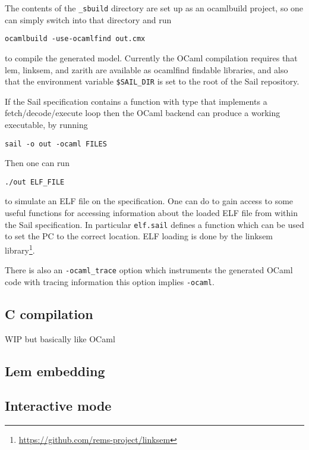 The contents of the \verb+_sbuild+ directory are set up as an
ocamlbuild project, so one can simply switch into that directory and run
\begin{verbatim}
ocamlbuild -use-ocamlfind out.cmx
\end{verbatim}
to compile the generated model. Currently the OCaml compilation
requires that lem, linksem, and zarith are available as ocamlfind
findable libraries, and also that the environment variable
\verb+$SAIL_DIR+ is set to the root of the Sail repository.

If the Sail specification contains a  function with type
 that implements a fetch/decode/execute loop then the
OCaml backend can produce a working executable, by running
\begin{verbatim}
sail -o out -ocaml FILES
\end{verbatim}
Then one can run
\begin{verbatim}
./out ELF_FILE
\end{verbatim}
to simulate an ELF file on the specification. One can do  to gain access to some useful functions for accessing
information about the loaded ELF file from within the Sail
specification. In particular \verb+elf.sail+ defines a function
 which can be used to set the PC to the
correct location. ELF loading is done by the linksem
library\footnote{\url{https://github.com/rems-project/linksem}}.

There is also an \verb+-ocaml_trace+ option which instruments the
generated OCaml code with tracing information this option implies \verb+-ocaml+.

\subsection{C compilation}

WIP but basically like OCaml

\subsection{Lem embedding}


\subsection{Interactive mode}

